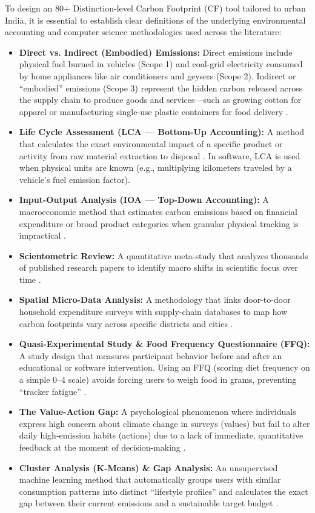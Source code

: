 \documentclass[12pt, a4paper]{article}
\begin{document}
To design an 80+ Distinction-level Carbon Footprint (CF) tool tailored to urban India, it is essential to establish clear definitions of the underlying environmental accounting and computer science methodologies used across the literature:

\begin{itemize}[leftmargin=*]
    \item \textbf{Direct vs. Indirect (Embodied) Emissions:} Direct emissions include physical fuel burned in vehicles (Scope 1) and coal-grid electricity consumed by home appliances like air conditioners and geysers (Scope 2). Indirect or ``embodied'' emissions (Scope 3) represent the hidden carbon released across the supply chain to produce goods and services---such as growing cotton for apparel or manufacturing single-use plastic containers for food delivery \cite{shi2021global, koide2019carbon}.
    \item \textbf{Life Cycle Assessment (LCA --- Bottom-Up Accounting):} A method that calculates the exact environmental impact of a specific product or activity from raw material extraction to disposal \cite{shi2021global, liu2020packaging}. In software, LCA is used when physical units are known (e.g., multiplying kilometers traveled by a vehicle's fuel emission factor).
    \item \textbf{Input-Output Analysis (IOA --- Top-Down Accounting):} A macroeconomic method that estimates carbon emissions based on financial expenditure or broad product categories when granular physical tracking is impractical \cite{shi2021global}.
    \item \textbf{Scientometric Review:} A quantitative meta-study that analyzes thousands of published research papers to identify macro shifts in scientific focus over time \cite{shi2021global}.
    \item \textbf{Spatial Micro-Data Analysis:} A methodology that links door-to-door household expenditure surveys with supply-chain databases to map how carbon footprints vary across specific districts and cities \cite{lee2021india}.
    \item \textbf{Quasi-Experimental Study \& Food Frequency Questionnaire (FFQ):} A study design that measures participant behavior before and after an educational or software intervention. Using an FFQ (scoring diet frequency on a simple 0--4 scale) avoids forcing users to weigh food in grams, preventing ``tracker fatigue'' \cite{malan2020impact}.
    \item \textbf{The Value-Action Gap:} A psychological phenomenon where individuals express high concern about climate change in surveys (values) but fail to alter daily high-emission habits (actions) due to a lack of immediate, quantitative feedback at the moment of decision-making \cite{khandelwal2019students}.
    \item \textbf{Cluster Analysis (K-Means) \& Gap Analysis:} An unsupervised machine learning method that automatically groups users with similar consumption patterns into distinct ``lifestyle profiles'' and calculates the exact gap between their current emissions and a sustainable target budget \cite{koide2019carbon}.
\end{itemize}
\end{document}
